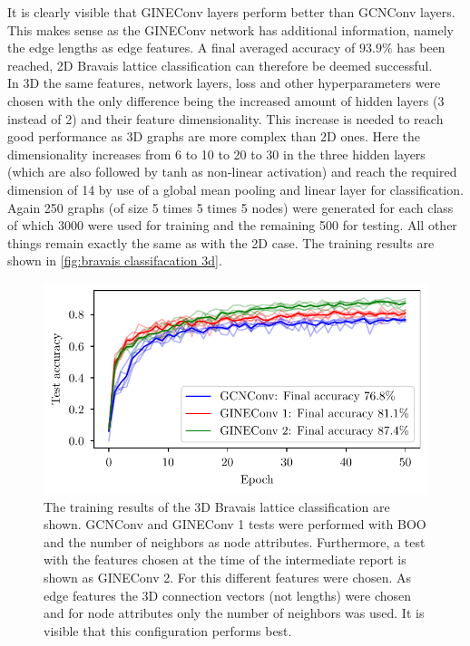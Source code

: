 \documentclass[11pt,a4paper]{article}
\begin{document}
It is clearly visible that GINEConv layers perform better than GCNConv layers. 
This makes sense as the GINEConv network has additional information, namely the edge lengths as edge features. 
A final averaged accuracy of $93.9\%$ has been reached, 2D Bravais lattice classification can therefore be deemed successful. \\

In 3D the same features, network layers, loss and other hyperparameters were chosen with the only difference being the increased amount of hidden layers (3 instead of 2) and their feature dimensionality. 
This increase is needed to reach good performance as 3D graphs are more complex than 2D ones. 
Here the dimensionality increases from 6 to 10 to 20 to 30 in the three hidden layers (which are also followed by $\mathrm{tanh}$ as non-linear activation) and reach the required dimension of 14 by use of a global mean pooling and linear layer for classification. 
Again 250 graphs (of size 5 times 5 times 5 nodes) were generated for each class of which 3000 were used for training and the remaining 500 for testing. 
All other things remain exactly the same as with the 2D case. 
The training results are shown in \autoref{fig:bravais classifacation 3d}. 
\begin{figure}[htbp]
    \centering
    \includegraphics{images/plots/3d_classifier_results.pdf}
    \caption{The training results of the 3D Bravais lattice classification are shown. GCNConv and GINEConv 1 tests were performed with BOO and the number of neighbors as node attributes. Furthermore, a test with the features chosen at the time of the intermediate report is shown as GINEConv 2. For this different features were chosen. As edge features the 3D connection vectors (not lengths) were chosen and for node attributes only the number of neighbors was used. It is visible that this configuration performs best.}
    \label{fig:bravais classifacation 3d}
\end{figure}
\end{document}
